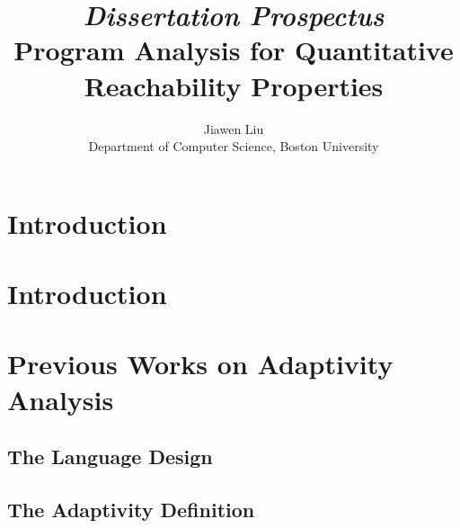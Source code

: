 \documentclass[a4paper,11pt]{article}
\begin{document}
\title{{\em Dissertation Prospectus}
\\
{Program Analysis for Quantitative Reachability Properties}
}

\author{Jiawen Liu\\ Department of Computer Science, Boston University}
\maketitle
\begin{abstract}

\end{abstract}

\clearpage
\tableofcontents{}

\clearpage
\section{Introduction}
\label{sec:introduction}


\section*{ }
%

\section{Introduction}
\label{sec:adapt-intro}


\section{Previous Works on Adaptivity Analysis}
\label{sec:prework}

\subsection{The Language Design}
\label{sec:prework-language}

%
\subsection{The Adaptivity Definition}
\label{sec:prework-formalization}

%
\end{document}
